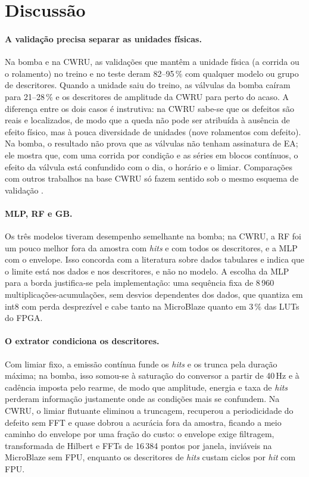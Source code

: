 \documentclass[12pt]{article}
\begin{document}
\section{Discussão}
\label{sec:discussao}

\paragraph{A validação precisa separar as unidades físicas.} Na bomba e na CWRU, as validações que mantêm a unidade física (a corrida ou o rolamento) no treino e no teste deram 82--95\,\% com qualquer modelo ou grupo de descritores. Quando a unidade saiu do treino, as válvulas da bomba caíram para 21--28\,\% e os descritores de amplitude da CWRU para perto do acaso. A diferença entre os dois casos é instrutiva: na CWRU sabe-se que os defeitos são reais e localizados, de modo que a queda não pode ser atribuída à ausência de efeito físico, mas à pouca diversidade de unidades (nove rolamentos com defeito). Na bomba, o resultado não prova que as válvulas não tenham assinatura de EA; ele mostra que, com uma corrida por condição e as séries em blocos contínuos, o efeito da válvula está confundido com o dia, o horário e o limiar. Comparações com outros trabalhos na base CWRU só fazem sentido sob o mesmo esquema de validação \cite{rauber2021,hendriks2022}.

\paragraph{MLP, RF e GB.} Os três modelos tiveram desempenho semelhante na bomba; na CWRU, a RF foi um pouco melhor fora da amostra com \textit{hits} e com todos os descritores, e a MLP com o envelope. Isso concorda com a literatura sobre dados tabulares \cite{fernandezdelgado2014,grinsztajn2022,shwartzziv2022} e indica que o limite está nos dados e nos descritores, e não no modelo. A escolha da MLP para a borda justifica-se pela implementação: uma sequência fixa de 8\,960 multiplicações-acumulações, sem desvios dependentes dos dados, que quantiza em int8 com perda desprezível e cabe tanto na MicroBlaze quanto em 3\,\% das LUTs do FPGA.

\paragraph{O extrator condiciona os descritores.} Com limiar fixo, a emissão contínua funde os \textit{hits} e os trunca pela duração máxima; na bomba, isso somou-se à saturação do conversor a partir de 40\,Hz e à cadência imposta pelo rearme, de modo que amplitude, energia e taxa de \textit{hits} perderam informação justamente onde as condições mais se confundem. Na CWRU, o limiar flutuante eliminou a truncagem, recuperou a periodicidade do defeito sem FFT e quase dobrou a acurácia fora da amostra, ficando a meio caminho do envelope por uma fração do custo: o envelope exige filtragem, transformada de Hilbert e FFTs de 16\,384 pontos por janela, inviáveis na MicroBlaze sem FPU, enquanto os descritores de \textit{hits} custam \mbHitFpu{} ciclos por \textit{hit} com FPU.
\end{document}
